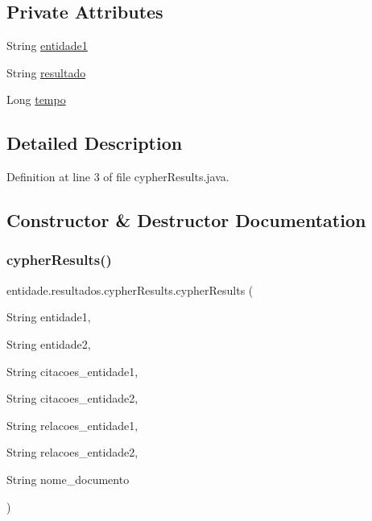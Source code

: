 \subsection*{Private Attributes}
\begin{DoxyCompactItemize}
\item 
String \hyperlink{classentidade_1_1resultados_1_1cypherResults_a9baf0ede3f9f4ee7aa7c6863033b9e5c}{entidade1}
\item 
String \hyperlink{classentidade_1_1resultados_1_1cypherResults_af77782dbcb06c64d5d2d0b387bc9fd09}{resultado}
\item 
Long \hyperlink{classentidade_1_1resultados_1_1cypherResults_a98c868396c9a666d35d2a4fd9adc2e2d}{tempo}
\end{DoxyCompactItemize}


\subsection{Detailed Description}


Definition at line 3 of file cypher\+Results.\+java.



\subsection{Constructor \& Destructor Documentation}
\hypertarget{classentidade_1_1resultados_1_1cypherResults_aa6fe60ac9bde49616bfdcae4584612ca}{}\label{classentidade_1_1resultados_1_1cypherResults_aa6fe60ac9bde49616bfdcae4584612ca} 
\subsubsection{\texorpdfstring{cypher\+Results()}{cypherResults()}\hspace{0.1cm}{\footnotesize\ttfamily [1/2]}}
{\footnotesize\ttfamily entidade.\+resultados.\+cypher\+Results.\+cypher\+Results (\begin{DoxyParamCaption}\item[{String}]{entidade1,  }\item[{String}]{entidade2,  }\item[{String}]{citacoes\+\_\+entidade1,  }\item[{String}]{citacoes\+\_\+entidade2,  }\item[{String}]{relacoes\+\_\+entidade1,  }\item[{String}]{relacoes\+\_\+entidade2,  }\item[{String}]{nome\+\_\+documento }\end{DoxyParamCaption})}



